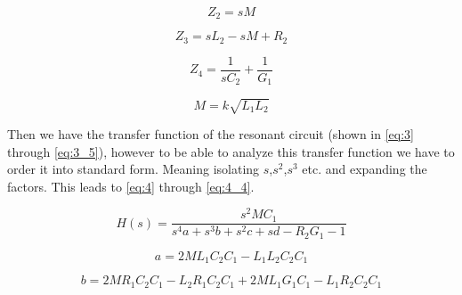 \begin{equation} \label{eq:3_2}
    Z_2 = s M
\end{equation}

\begin{equation} \label{eq:3_3}
    Z_3 = s L_2 - s M + R_2
\end{equation}

\begin{equation} \label{eq:3_4}
    Z_4 = \frac{1}{s C_2} + \frac{1}{G_1}
\end{equation}

\begin{equation} \label{eq:3_5}
    M = k \sqrt{L_1 L_2}
\end{equation}


Then we have the transfer function of the resonant circuit (shown in \cref{eq:3} through \cref{eq:3_5}), however to be able to analyze this transfer function we have to order it into standard form. Meaning isolating $s$,$s^2$,$s^3$ etc. and expanding the factors. This leads to \cref{eq:4} through \cref{eq:4_4}.


\begin{equation} \label{eq:4}
    H(s) = \frac{s^2 M C_1}{s^4 a + s^3 b + s^2 c + s d - R_2 G_1- 1}
\end{equation}

\begin{equation} \label{eq:4_1}
    a = 2 M L_1 C_2 C_1 - L_1 L_2 C_2 C_1
\end{equation}

\begin{equation} \label{eq:4_2}
    b = 2 M R_1 C_2 C_1 - L_2 R_1 C_2 C_1 + 2 M L_1 G_1 C_1 - L_1 R_2 C_2 C_1
\end{equation}

